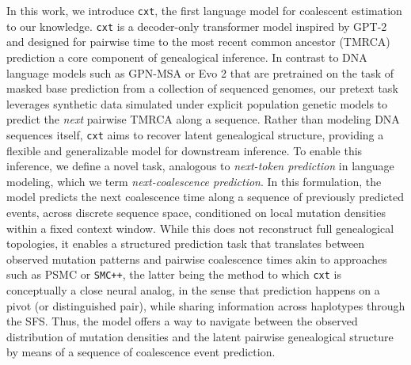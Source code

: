 \documentclass{article}
\newcommand{\cxtkit}{\texttt{cxt}\xspace}
\let\citep\parencite
\newcommand{\smcpp}{\texttt{SMC++}\xspace}
\begin{document}
In this work, we introduce \cxtkit, the first language model for coalescent estimation to our knowledge. \cxtkit is a decoder-only transformer model inspired by GPT-2 and designed for pairwise time to the most recent common ancestor (TMRCA) prediction \textemdash a core component of genealogical inference. 
In contrast to DNA language models such as GPN-MSA or Evo 2  \citep{benegas2025dna, brixi2025genome} 
that are pretrained on the task of masked base prediction from a collection of sequenced genomes, 
our pretext task leverages synthetic data simulated under explicit population genetic models to predict the \emph{next} pairwise TMRCA along a sequence. 
Rather than modeling DNA sequences itself, \cxtkit aims to recover latent genealogical structure, providing a flexible and generalizable model for downstream inference. 
To enable this inference, we define a novel task, analogous to \textit{next-token prediction} in language modeling, which we term \textit{next-coalescence prediction}. In this formulation, the model predicts the next coalescence time along a sequence of previously predicted events, across discrete sequence space, conditioned on local mutation densities %
within a fixed context window. While this does not reconstruct full genealogical topologies, it enables a structured prediction task that translates between observed mutation patterns and pairwise coalescence times \textemdash akin to approaches such as PSMC or \smcpp, the latter being the method to which \cxtkit is conceptually a close neural analog, in the sense that prediction happens on a pivot (or distinguished pair), while sharing information across haplotypes through the SFS. Thus, the model offers a way to navigate between the observed distribution of mutation densities and the latent pairwise genealogical structure by means of a sequence of coalescence event prediction.
\end{document}
